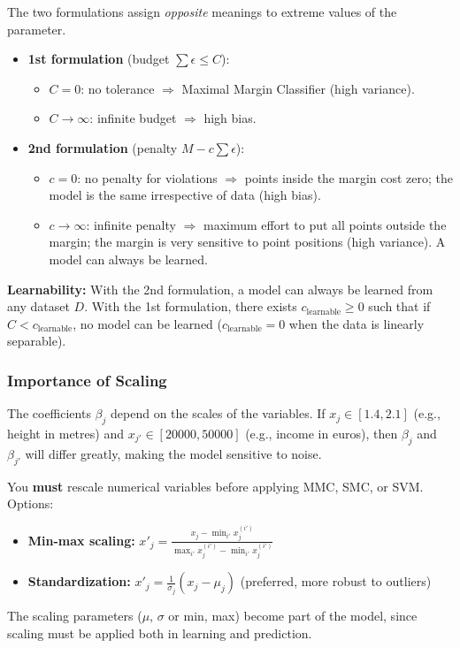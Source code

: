 The two formulations assign \emph{opposite} meanings to extreme values of the parameter.

    \begin{itemize}
        \item \textbf{1st formulation} (budget $\sum \epsilon \le C$):
        \begin{itemize}
            \item $C = 0$: no tolerance $\Rightarrow$ Maximal Margin Classifier (high variance).
            \item $C \to \infty$: infinite budget $\Rightarrow$ high bias.
        \end{itemize}
        \item \textbf{2nd formulation} (penalty $M - c\sum\epsilon$):
        \begin{itemize}
            \item $c = 0$: no penalty for violations $\Rightarrow$ points inside the margin cost zero; the model is the same irrespective of data (high bias).
            \item $c \to \infty$: infinite penalty $\Rightarrow$ maximum effort to put all points outside the margin; the margin is very sensitive to point positions (high variance). A model can always be learned.
        \end{itemize}
    \end{itemize}
    \textbf{Learnability:} With the 2nd formulation, a model can always be learned from any dataset $D$. With the 1st formulation, there exists $c_{\text{learnable}} \ge 0$ such that if $C < c_{\text{learnable}}$, no model can be learned ($c_{\text{learnable}} = 0$ when the data is linearly separable).

\subsubsection{Importance of Scaling}

The coefficients $\beta_j$ depend on the scales of the variables. If $x_j \in [1.4, 2.1]$ (e.g., height in metres) and $x_{j'} \in [20000, 50000]$ (e.g., income in euros), then $\beta_j$ and $\beta_{j'}$ will differ greatly, making the model sensitive to noise.

\begin{tipsblock}
    You \textbf{must} rescale numerical variables before applying MMC, SMC, or SVM. Options:
    \begin{itemize}
        \item \textbf{Min-max scaling:} $x'_j = \frac{x_j - \min_{i'} x^{(i')}_j}{\max_{i'} x^{(i')}_j - \min_{i'} x^{(i')}_j}$
        \item \textbf{Standardization:} $x'_j = \frac{1}{\sigma_j}(x_j - \mu_j)$ (preferred, more robust to outliers)
    \end{itemize}
    The scaling parameters ($\mu$, $\sigma$ or min, max) become part of the model, since scaling must be applied both in learning and prediction.
\end{tipsblock}

